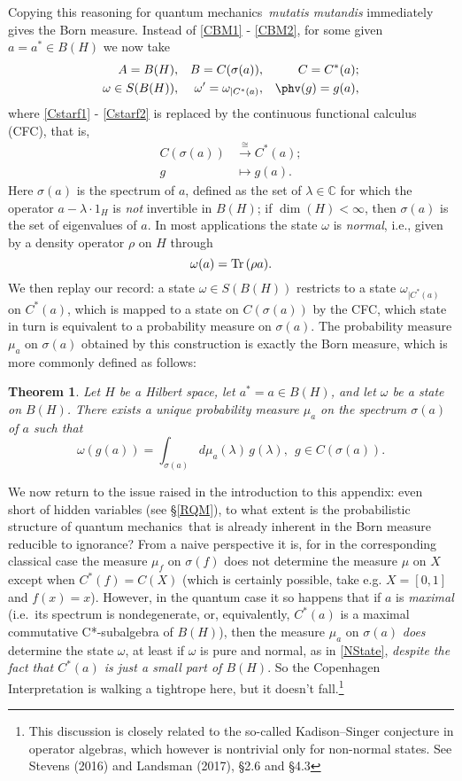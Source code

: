 \documentclass[12pt]{article}
\numberwithin{equation}{section}
\newcommand{\qm}{quantum mechanics}
\newcommand{\er}{\eqref}
\newcommand{\raw}{\rightarrow}
\newcommand{\Hs}{Hilbert space} \newcommand{\Bs}{Banach space}
\newcommand{\lm}{\lambda} \newcommand{\Lm}{\Lambda}
\newcommand{\rh}{\rho} \newcommand{\sg}{\sigma}
\newcommand{\om}{\omega} \newcommand{\Om}{\Omega}
\newcommand{\Tr}{\mbox{\rm Tr}\,}
\newcommand{\C}{{\mathbb C}}
\newtheorem{theorem}[definition]{Theorem}
\begin{document}
Copying this reasoning for \qm\  \emph{mutatis mutandis} immediately gives the Born measure. Instead of \er{CBM1} - \er{CBM2}, for some given $a=a^*\in B(H)$ we now take
\begin{align}
A=B(H), && B=C(\sg(a)), && C= C^*(a); \label{QBM1} 
\\  \om\in S(B(H)), && \om'=\om_{|C^*(a)}, && \phv(g)=g (a),\label{QBM2}
\end{align}
where  \er{Cstarf1} - \er{Cstarf2} is replaced by the  continuous functional calculus (CFC), that is, 
\begin{align}
C(\sg(a))&\stackrel{\cong}{\raw} C^*(a); \label{CFC1}\\
g&\mapsto g(a).\label{CFC2}
\end{align} 
Here $\sg(a)$ is the spectrum of $a$, defined as the set of $\lm\in\C$ for which the operator $a-\lm\cdot 1_H$ is \emph{not} invertible in $B(H)$; if $\dim(H)<\infty$, then $\sg(a)$ is the set of eigenvalues of $a$. In most applications the state $\om$ is \emph{normal}, i.e., given by a density operator $\rh$ on $H$ through
\begin{equation}
\om(a)=\Tr(\rh a).  \label{NState}
\end{equation}
We then replay our record: a state $\om\in S(B(H))$ restricts to a state $\om_{|C^*(a)}$ on $C^*(a)$, which is mapped to a state on $C(\sg(a))$ by the CFC, which state in turn is equivalent to a  probability measure on $\sg(a)$.
The probability measure $\mu_a$ on $\sg(a)$ obtained by this construction is exactly the Born measure, which is  more commonly defined as follows:
 \begin{theorem}\label{defBornmu}
 Let $H$ be a \Hs, let $a^*=a\in B(H)$, and let $\om$ be a state on $B(H)$.
  There exists a unique probability measure 
 $\mu_a$ on the spectrum $\sg(a)$ of $a$ such that 
 \begin{equation}
\om(g(a))=\int_{\sg(a)} d\mu_a(\lm)\, g(\lm), \:\: g\in C(\sg(a)).\label{BornfromGelfand}
\end{equation}
  \end{theorem}
We now return to the issue raised in the introduction to this appendix: even short of hidden variables (see \S\ref{RQM}), to what extent is the probabilistic structure of \qm\ that is already inherent in the Born measure  reducible to ignorance? From a naive perspective it is, for in the corresponding classical case the measure $\mu_f$ on $\sg(f)$ does not determine the measure $\mu$ on $X$ except when $C^*(f)=C(X)$ (which is certainly possible, take e.g. $X=[0,1]$ and $f(x)=x$). However, in the quantum case it so happens that if $a$ is \emph{maximal} (i.e.\ its spectrum is nondegenerate, or, equivalently, $C^*(a)$ is a maximal commutative C*-subalgebra of $B(H)$), then the measure $\mu_a$ on $\sg(a)$ \emph{does} determine the state $\om$, at least if $\om$ is pure and normal, as in \er{NState}, \emph{despite the fact that $C^*(a)$ is just a small part of $B(H)$}.
So the Copenhagen Interpretation is walking a tightrope here, but it doesn't fall.\footnote{This discussion is closely related to the so-called Kadison--Singer conjecture in operator algebras, which however is nontrivial only for non-normal states. 
See Stevens (2016) and Landsman (2017), \S 2.6 and \S 4.3  }
\end{document}
